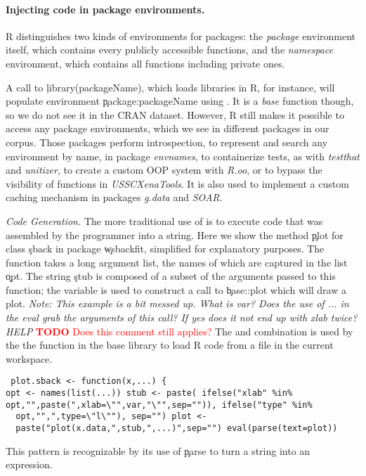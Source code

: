 \documentclass[review,screen,acmsmall,anonymous=true]{acmart}
\newcommand{\mypara}[1]{\medskip\noindent\emph{#1}\xspace}
\newcommand{\NOTE}[1]{{\it Note: #1}\xspace}
\newcommand{\authorcomment}[3]{\xspace\textcolor{#1}{{\bf #2} #3}\xspace}
\newcommand{\todo}[1]{\authorcomment{red}{TODO}{#1}}
\begin{document}
\paragraph{Injecting code in package environments.} R distinguishes two kinds of environments for packages: the \emph{package} environment itself, which contains every publicly accessible functions, and the \emph{namespace} environment, which contains all functions including private ones.

 A call to \c{library(packageName)}, which loads libraries in R, for instance, will
populate environment \c{package:packageName} using \eval. It is a \emph{base} function
though, so we do not see it in the CRAN dataset. However, R still makes it
possible to access any package environments, which we see in
\packageNbPackageEnvPackages different packages in our corpus. Those packages perform
introspection, to represent and search any environment by name, in package
\emph{envnames}, to containerize tests, as with \emph{testthat} and
\emph{unitizer}, to create a custom OOP system with \emph{R.oo}, or to bypass the visibility of functions in \emph{USSCXenaTools}. It is also used to
implement a custom caching mechanism in packages \emph{g.data} and \emph{SOAR}.

\mypara{Code Generation.} The more traditional use of \eval is to execute code
that was assembled by the programmer into a string. Here we show the method
\c{plot} for class \c{sback} in package \c{wsbackfit}, simplified for
explanatory purposes. The function takes a long argument list, the names of
which are captured in the list \c{opt}. The string \c{stub} is composed of a
subset of the arguments passed to this function; the variable is used to
construct a call to \c{base::plot} which will draw a plot. \NOTE{This example
  is a bit messed up. What is var? Does the use of ... in the eval grab the
arguments of this call? If yes does it not end up with xlab twice? HELP}
\todo{Does this comment still applies?} The \parse and \eval combination is
used by the the \source function in the base library to load R code from a file
in the current workspace.  \begin{lstlisting} plot.sback <- function(x,...) {
opt <- names(list(...)) stub <- paste( ifelse("xlab" %in%
opt,"",paste(",xlab=\"",var,"\"",sep="")), ifelse("type" %in%
  opt,"",",type=\"l\""), sep="") plot <-
  paste("plot(x.data,",stub,",...)",sep="") eval(parse(text=plot))
  \end{lstlisting} This pattern is recognizable by its use of \c{parse} to turn
  a string into an expression.
\end{document}
